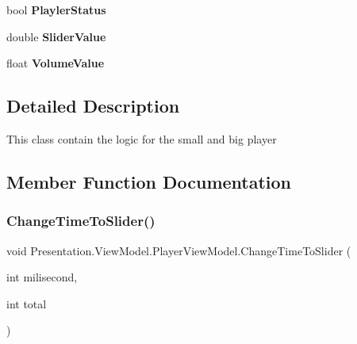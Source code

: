\begin{DoxyCompactItemize}
\item 
\mbox{\label{class_presentation_1_1_view_model_1_1_player_view_model_a47d8955accfeef86a15e2f9df099a475}} 
bool {\bfseries Playler\+Status}
\item 
\mbox{\label{class_presentation_1_1_view_model_1_1_player_view_model_a85051176aa367598c5f33c1a10fa787e}} 
double {\bfseries Slider\+Value}
\item 
\mbox{\label{class_presentation_1_1_view_model_1_1_player_view_model_a4f12efdf37816186501830f40bf0bb09}} 
float {\bfseries Volume\+Value}
\end{DoxyCompactItemize}


\subsection{Detailed Description}
This class contain the logic for the small and big player 



\subsection{Member Function Documentation}
\mbox{\label{class_presentation_1_1_view_model_1_1_player_view_model_ae27f5e428604e168e00216a5775e4f20}} 
\subsubsection{\texorpdfstring{Change\+Time\+To\+Slider()}{ChangeTimeToSlider()}}
{\footnotesize\ttfamily void Presentation.\+View\+Model.\+Player\+View\+Model.\+Change\+Time\+To\+Slider (\begin{DoxyParamCaption}\item[{int}]{milisecond,  }\item[{int}]{total }\end{DoxyParamCaption})}



